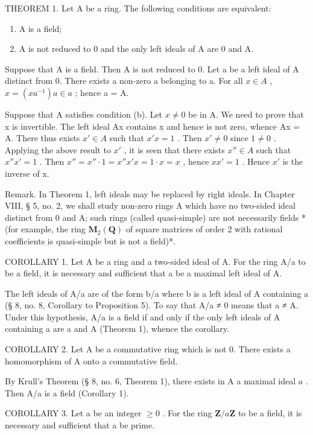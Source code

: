 THEOREM 1. Let A be a ring. The following conditions are equivalent:

\begin{enumerate}
\def\labelenumi{(\alph{enumi})}
\item
  A is a field;
\item
  A is not reduced to 0 and the only left ideals of A are 0 and A.
\end{enumerate}

Suppose that A is a field. Then A is not reduced to 0. Let a be a left ideal of A distinct from 0. There exists a non-zero a belonging to a. For all \(x \in A\) , \(x = (xa^{-1})a \in a\) ; hence a = A.

Suppose that A satisfies condition (b). Let \(x \neq 0\) be in A. We need to prove that x is invertible. The left ideal Ax contains x and hence is not zero, whence Ax = A. There thus exists \(x' \in A\) such that \(x'x = 1\) . Then \(x' \neq 0\) since \(1 \neq 0\) . Applying the above result to \(x'\) , it is seen that there exists \(x'' \in A\) such that \(x''x' = 1\) . Then \(x'' = x'' \cdot 1 = x''x'x = 1 \cdot x = x\) , hence \(xx' = 1\) . Hence \(x'\) is the inverse of x.

Remark. In Theorem 1, left ideals may be replaced by right ideals. In Chapter VIII, § 5, no. 2, we shall study non-zero rings A which have no two-sided ideal distinct from 0 and A; such rings (called quasi-simple) are not necessarily fields * (for example, the ring \(\mathbf{M}_2(\mathbf{Q})\) of square matrices of order 2 with rational coefficients is quasi-simple but is not a field)*.

COROLLARY 1. Let A be a ring and a two-sided ideal of A. For the ring A/a to be a field, it is necessary and sufficient that a be a maximal left ideal of A.

The left ideals of A/a are of the form b/a where b is a left ideal of A containing a (§ 8, no. 8, Corollary to Proposition 5). To say that A/a ≠ 0 means that a ≠ A. Under this hypothesis, A/a is a field if and only if the only left ideals of A containing a are a and A (Theorem 1), whence the corollary.

COROLLARY 2. Let A be a commutative ring which is not 0. There exists a homomorphism of A onto a commutative field.

By Krull's Theorem (§ 8, no. 6, Theorem 1), there exists in A a maximal ideal \(a\) . Then A/a is a field (Corollary 1).

COROLLARY 3. Let a be an integer \(\geqslant 0\) . For the ring \(\mathbf{Z} / a\mathbf{Z}\) to be a field, it is necessary and sufficient that a be prime.

